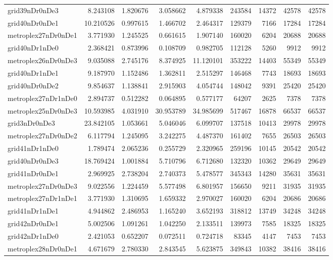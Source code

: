\begin{longtable}{|l|r|r|r|r|r|r|r|r|}
grid39nDr0nDe3 & 8.243108 & 1.820676 & 3.058662 & 4.879338 & 243584 & 14372 & 42578 & 42578 \\
grid40nDr0nDe1 & 10.210526 & 0.997615 & 1.466702 & 2.464317 & 129379 & 7166 & 17284 & 17284 \\
metroplex27nDr0nDe1 & 3.771930 & 1.245525 & 0.661615 & 1.907140 & 160020 & 6204 & 20688 & 20688 \\
grid40nDr1nDe0 & 2.368421 & 0.873996 & 0.108709 & 0.982705 & 112128 & 5260 & 9912 & 9912 \\
metroplex26nDr0nDe3 & 9.035088 & 2.745176 & 8.374925 & 11.120101 & 353222 & 14403 & 55349 & 55349 \\
grid40nDr1nDe1 & 9.187970 & 1.152486 & 1.362811 & 2.515297 & 146468 & 7743 & 18693 & 18693 \\
grid40nDr0nDe2 & 9.854637 & 1.138841 & 2.915903 & 4.054744 & 148042 & 9391 & 25420 & 25420 \\
metroplex27nDr1nDe0 & 2.894737 & 0.512282 & 0.064895 & 0.577177 & 64207 & 2625 & 7378 & 7378 \\
metroplex25nDr0nDe3 & 10.593985 & 4.031910 & 30.953789 & 34.985699 & 517467 & 16878 & 66537 & 66537 \\
grid3nDr0nDe3 & 23.842105 & 1.053661 & 5.046046 & 6.099707 & 137518 & 10413 & 29978 & 29978 \\
metroplex27nDr0nDe2 & 6.117794 & 1.245095 & 3.242275 & 4.487370 & 161402 & 7655 & 26503 & 26503 \\
grid41nDr1nDe0 & 1.789474 & 2.065236 & 0.255729 & 2.320965 & 259196 & 10145 & 20542 & 20542 \\
grid40nDr0nDe3 & 18.769424 & 1.001884 & 5.710796 & 6.712680 & 132320 & 10362 & 29649 & 29649 \\
grid41nDr0nDe1 & 2.969925 & 2.738204 & 2.740373 & 5.478577 & 345343 & 14280 & 35631 & 35631 \\
metroplex27nDr0nDe3 & 9.022556 & 1.224459 & 5.577498 & 6.801957 & 156650 & 9211 & 31935 & 31935 \\
metroplex27nDr1nDe1 & 3.771930 & 1.310695 & 1.659332 & 2.970027 & 160020 & 6204 & 20686 & 20686 \\
grid41nDr1nDe1 & 4.944862 & 2.486953 & 1.165240 & 3.652193 & 318812 & 13749 & 34248 & 34248 \\
grid42nDr0nDe1 & 5.002506 & 1.091261 & 1.042250 & 2.133511 & 139973 & 7585 & 18325 & 18325 \\
grid42nDr1nDe0 & 2.421053 & 0.652207 & 0.072511 & 0.724718 & 83345 & 4147 & 7453 & 7453 \\
metroplex28nDr0nDe1 & 4.671679 & 2.780330 & 2.843545 & 5.623875 & 349843 & 10382 & 38416 & 38416 \\

\end{longtable}
